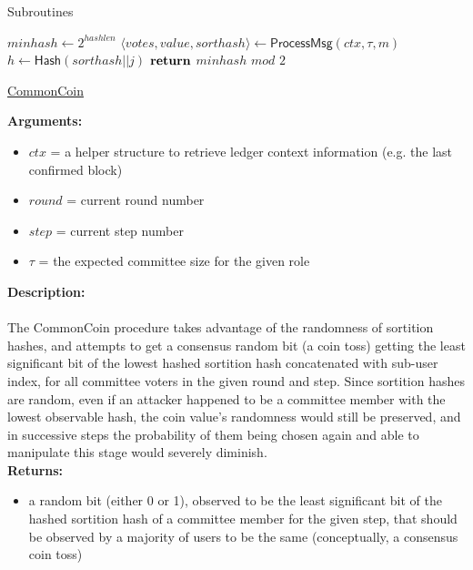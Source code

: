 \documentclass[10pt,a4paper]{article}
\begin{document}
\begin{section}{Subroutines}
\begin{algorithm}[H]
    \begin{algorithmic}[H]

    \State $minhash \gets 2^{hashlen}$
        \State $\langle votes,value,sorthash\rangle \gets \mathsf{ProcessMsg}(ctx,\tau,m)$
                \State $h \gets \mathsf{Hash}(sorthash||j)$
        \EndFor
    \EndFor
    $\Return$ $minhash$ $mod$ $2$
    \EndFunction
    \end{algorithmic}
    \caption{\underline{CommonCoin}}
\end{algorithm}


\noindent \textbf{Arguments:}
\begin{itemize}
    \item $ctx$ = a helper structure to retrieve ledger context information (e.g. the last confirmed block)
    \item $round$ = current round number
    \item $step$ = current step number
    \item $\tau$ = the expected committee size for the given role
  \end{itemize}

\noindent \textbf{Description:}\\\\
The CommonCoin procedure takes advantage of the randomness of sortition hashes, and attempts to
get a consensus random bit (a coin toss) getting the least significant bit of the lowest hashed
sortition hash concatenated with sub-user index, for all committee voters in the given round and step.
Since sortition hashes are random, even if an attacker happened to be a committee member with the lowest observable hash,
the coin value's randomness would still be preserved, and in successive steps the probability of them being chosen again and
able to manipulate this stage would severely diminish.\\

\noindent \textbf{Returns:}
\begin{itemize}
    \item a random bit (either 0 or 1), observed to be the least significant bit of the hashed sortition hash of a committee member for the given step,
    that should be observed by a majority of users to be the same (conceptually, a consensus coin toss)
  \end{itemize}

\end{section}



\end{document}
